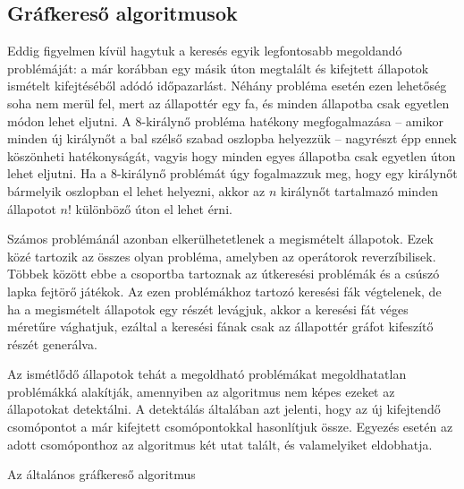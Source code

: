 \subsection{Gráfkereső algoritmusok}

Eddig figyelmen kívül hagytuk a keresés egyik legfontosabb megoldandó
problémáját: a már korábban egy másik úton megtalált és kifejtett állapotok
ismételt kifejtéséből adódó időpazarlást. Néhány probléma esetén ezen lehetőség
soha nem merül fel, mert az állapottér egy fa, és minden állapotba csak
egyetlen módon lehet eljutni. A 8-királynő probléma hatékony megfogalmazása –
amikor minden új királynőt a bal szélső szabad oszlopba helyezzük – nagyrészt
épp ennek köszönheti hatékonyságát, vagyis hogy minden egyes állapotba csak
egyetlen úton lehet eljutni. Ha a 8-királynő problémát úgy fogalmazzuk meg,
hogy egy királynőt bármelyik oszlopban el lehet helyezni, akkor az $n$ királynőt
tartalmazó minden állapotot $n!$ különböző úton el lehet érni.

Számos problémánál azonban elkerülhetetlenek a megismételt állapotok. Ezek közé
tartozik az összes olyan probléma, amelyben az operátorok reverzíbilisek.
Többek között ebbe a csoportba tartoznak az útkeresési problémák és a csúszó
lapka fejtörő játékok. Az ezen problémákhoz tartozó keresési fák végtelenek, de
ha a megismételt állapotok egy részét levágjuk, akkor a keresési fát véges
méretűre vághatjuk, ezáltal a keresési fának csak az állapottér gráfot
kifeszítő részét generálva.

Az ismétlődő állapotok tehát a megoldható problémákat megoldhatatlan
problémákká alakítják, amennyiben az algoritmus nem képes ezeket az állapotokat
detektálni. A detektálás általában azt jelenti, hogy az új kifejtendő
csomópontot a már kifejtett csomópontokkal hasonlítjuk össze. Egyezés esetén az
adott csomóponthoz az algoritmus két utat talált, és valamelyiket eldobhatja.

\begin{algorithm}[H]

    \caption{Az általános gráfkereső algoritmus}
\end{algorithm}

